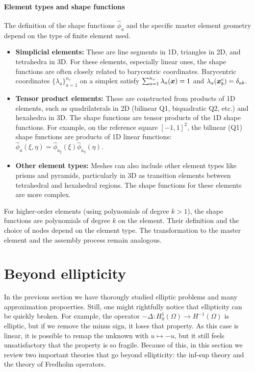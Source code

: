 \documentclass{article}
\renewcommand{\vec}{\vectorsym}
\begin{document}
\paragraph{Element types and shape functions}
The definition of the shape functions $\hat{\phi}_a$ and the specific master element geometry depend on the type of finite element used.
\begin{itemize}
    \item \textbf{Simplicial elements:} These are line segments in 1D, triangles in 2D, and tetrahedra in 3D. For these elements, especially linear ones, the shape functions are often closely related to barycentric coordinates. Barycentric coordinates $\{\lambda_a\}_{a=1}^{n_v}$ on a simplex satisfy $\sum_{a=1}^{n_v} \lambda_a(\vec{x}) = 1$ and $\lambda_a(\vec{x}_b^e) = \delta_{ab}$.
    \item \textbf{Tensor product elements:} These are constructed from products of 1D elements, such as quadrilaterals in 2D (bilinear Q1, biquadratic Q2, etc.) and hexahedra in 3D. The shape functions are tensor products of the 1D shape functions. For example, on the reference square $[-1,1]^2$, the bilinear (Q1) shape functions are products of 1D linear functions: $\hat{\phi}_a(\xi, \eta) = \hat{\phi}_{a_\xi}(\xi) \hat{\phi}_{a_\eta}(\eta)$.
    \item \textbf{Other element types:} Meshes can also include other element types like prisms and pyramids, particularly in 3D as transition elements between tetrahedral and hexahedral regions. The shape functions for these elements are more complex.
\end{itemize}
For higher-order elements (using polynomials of degree $k > 1$), the shape functions are polynomials of degree $k$ on the element. Their definition and the choice of nodes depend on the element type. The transformation to the master element and the assembly process remain analogous.
\section{Beyond ellipticity}\label{section:beyond-ellipticity}
In the previous section we have thorougly studied elliptic problems and many approximation propoerties. Still, one might rightfully notice that ellipticity can be quickly broken. For example, the operator $-\Delta: H_0^1(\Omega)\to H^{-1}(\Omega)$ is elliptic, but if we remove the minus sign, it loses that property. As this case is linear, it is possible to remap the unknown with $u\mapsto -u$, but it still feels unsatisfactory that the property is so fragile. Because of this, in this section we review two important theories that go beyond ellipticity: the inf-sup theory and the theory of Fredholm operators.
\end{document}
